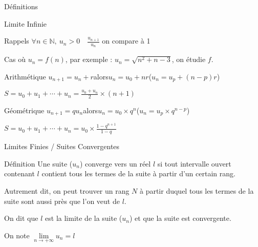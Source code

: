 \documentclass{cours}
\begin{document}
\begin{Gpartie}{Définitions}
\begin{Spartie}{Limite Infinie}
\begin{SSpartie}{Rappels}
                $\forall n\in\mathbb{N},\ u_n>0\quad\frac{u_{n+1}}{u_n}$ on compare à 1

                Cas où $u_n=f(n)$, par exemple : $u_n=\sqrt{n^2+n-3}$, on étudie $f$.
                \begin{SSSpartie}{Arithmétique} 
                    $u_{n+1}=u_n+r$\quad alors\quad $u_n=u_0+nr$\quad\big($u_n=u_p+(n-p)r$\big)

                    $S=u_0+u_1+\dotsb+u_n=\frac{u_0+u_n}{2}\times(n+1)$
                \end{SSSpartie}
                \begin{SSSpartie}{Géométrique} 
                    $u_{n+1}=qu_n$\quad alors\quad $u_n=u_0\times q^n$\quad\big($u_n=u_p\times q^{n-p}$\big)

                    $S=u_0+u_1+\dotsb+u_n=u_0\times\frac{1-q^{n+1}}{1-q}$
                \end{SSSpartie}
            \end{SSpartie}
        \end{Spartie}
        \pagebreak
        \begin{Spartie}{Limites Finies / Suites Convergentes} 
            \begin{SSpartie}{Définition} 
                Une suite ($u_n$) converge vers un réel $l$ si tout intervalle ouvert contenant $l$ contient tous les termes de la suite à partir d'un certain rang.

                Autrement dit, on peut trouver un rang $N$ à partir duquel tous les termes de la suite sont aussi près que l'on veut de $l$.

                On dit que $l$ est la limite de la suite ($u_n$) et que la suite est convergente.

                On note $\lim\limits_{n\to +\infty} u_n=l$


\end{SSpartie}
\end{Spartie}
\end{Gpartie}
\end{document}
